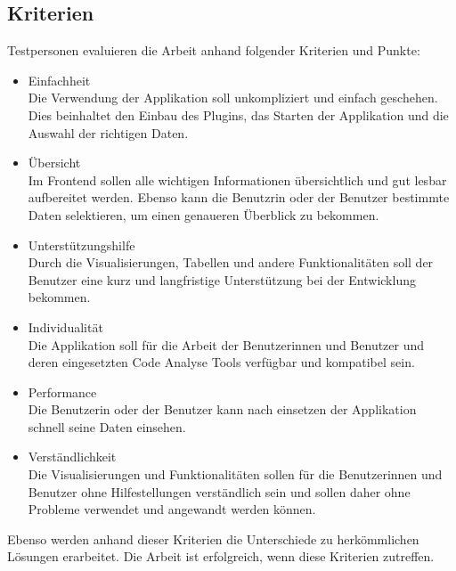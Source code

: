 \subsection{Kriterien} 
Testpersonen evaluieren die Arbeit anhand folgender Kriterien und Punkte:
\begin{itemize}
\item Einfachheit \\ Die Verwendung der Applikation soll unkompliziert und einfach geschehen. Dies beinhaltet den Einbau des Plugins, das Starten der Applikation und die Auswahl der richtigen Daten.
\item Übersicht \\ Im Frontend sollen alle wichtigen Informationen übersichtlich und gut lesbar aufbereitet werden. Ebenso kann die Benutzrin oder der Benutzer bestimmte Daten selektieren, um einen genaueren Überblick zu bekommen.
\item Unterstützungshilfe \\ Durch die Visualisierungen, Tabellen und andere Funktionalitäten soll der Benutzer eine kurz und langfristige Unterstützung bei der Entwicklung bekommen.
\item Individualität \\ Die Applikation soll für die Arbeit der Benutzerinnen und Benutzer und deren eingesetzten Code Analyse Tools verfügbar und kompatibel sein. 
\item Performance \\ Die Benutzerin oder der Benutzer kann nach einsetzen der Applikation schnell seine Daten einsehen.
\item Verständlichkeit \\ Die Visualisierungen und Funktionalitäten sollen für die Benutzerinnen und Benutzer ohne Hilfestellungen verständlich sein und sollen daher ohne Probleme verwendet und angewandt werden können.
\end{itemize}

Ebenso werden anhand dieser Kriterien die Unterschiede zu herkömmlichen Lösungen erarbeitet. Die Arbeit ist erfolgreich, wenn diese Kriterien zutreffen. 

